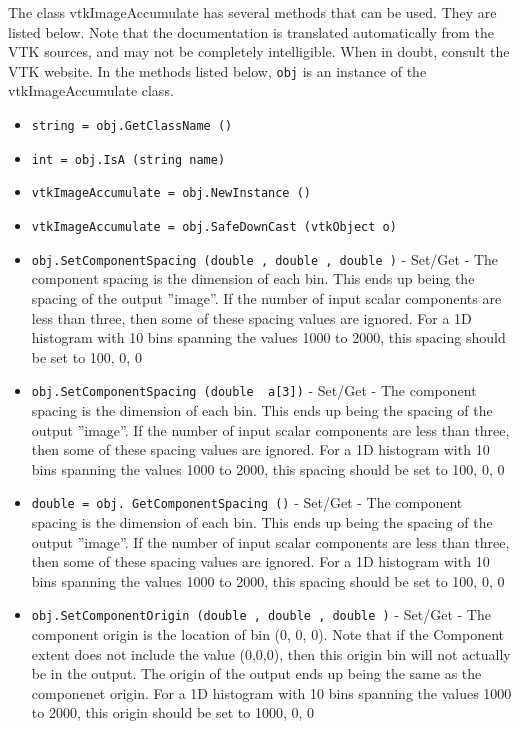 The class vtkImageAccumulate has several methods that can be used.
  They are listed below.
Note that the documentation is translated automatically from the VTK sources,
and may not be completely intelligible.  When in doubt, consult the VTK website.
In the methods listed below, \verb|obj| is an instance of the vtkImageAccumulate class.
\begin{itemize}
\item  \verb|string = obj.GetClassName ()|

\item  \verb|int = obj.IsA (string name)|

\item  \verb|vtkImageAccumulate = obj.NewInstance ()|

\item  \verb|vtkImageAccumulate = obj.SafeDownCast (vtkObject o)|

\item  \verb|obj.SetComponentSpacing (double , double , double )| -  Set/Get - The component spacing is the dimension of each bin.
 This ends up being the spacing of the output ''image''.
 If the number of input scalar components are less than three,
 then some of these spacing values are ignored.
 For a 1D histogram with 10 bins spanning the values 1000 to 2000,
 this spacing should be set to 100, 0, 0

\item  \verb|obj.SetComponentSpacing (double  a[3])| -  Set/Get - The component spacing is the dimension of each bin.
 This ends up being the spacing of the output ''image''.
 If the number of input scalar components are less than three,
 then some of these spacing values are ignored.
 For a 1D histogram with 10 bins spanning the values 1000 to 2000,
 this spacing should be set to 100, 0, 0

\item  \verb|double = obj. GetComponentSpacing ()| -  Set/Get - The component spacing is the dimension of each bin.
 This ends up being the spacing of the output ''image''.
 If the number of input scalar components are less than three,
 then some of these spacing values are ignored.
 For a 1D histogram with 10 bins spanning the values 1000 to 2000,
 this spacing should be set to 100, 0, 0

\item  \verb|obj.SetComponentOrigin (double , double , double )| -  Set/Get - The component origin is the location of bin (0, 0, 0).
 Note that if the Component extent does not include the value (0,0,0),
 then this origin bin will not actually be in the output.
 The origin of the output ends up being the same as the componenet origin.
 For a 1D histogram with 10 bins spanning the values 1000 to 2000,
 this origin should be set to 1000, 0, 0


\end{itemize}
